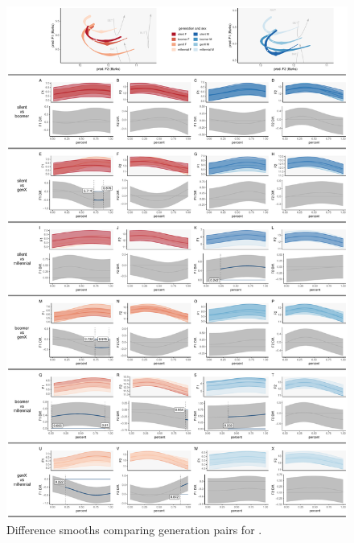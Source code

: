 \begin{figure}[p]
    \centering
    \includegraphics[width=\textwidth]{Figures/BAN/BAN_detailed_generation_panel_plot.pdf}
    \caption{Difference smooths comparing generation pairs for \ban.}
    \label{fig:ban_diff_smooths_gen}
\end{figure}

